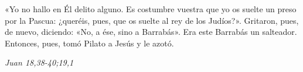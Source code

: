 \documentclass[../../devocionario.tex]{subfiles}
\begin{document}
    «Yo no hallo en Él delito alguno. Es costumbre vuestra que yo os suelte un preso por la Pascua: 
    ¿queréis, pues, que os suelte al rey de los Judíos?». Gritaron, pues, de nuevo, diciendo: «No, a ése, sino a Barrabás». 
    Era este Barrabás un salteador. Entonces, pues, tomó Pilato a Jesús y le azotó.

    \begin{flushright}
        \textit{Juan 18,38-40;19,1}
    \end{flushright}
\end{document}
